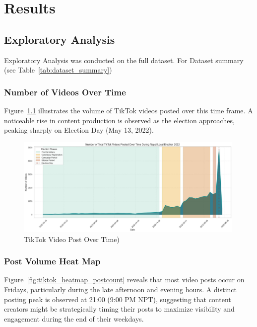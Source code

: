 \documentclass[12pt,a4paper]{report}
\begin{document}
\chapter{Results}
\section{Exploratory Analysis}
Exploratory Analysis was conducted on the full dataset. For Dataset summary (see Table~\ref{tab:dataset_summary})

\subsection{Number of Videos Over Time}
Figure~\ref{fig:tiktok_video_post} illustrates the volume of TikTok videos posted over this time frame. A noticeable rise in content production is observed as the election approaches, peaking sharply on Election Day (May 13, 2022).

\begin{figure}[htbp]
    \centering
    \includegraphics[width=0.99\textwidth]{figures/EDA/tiktok_video_counts_election_period.jpg}
    \caption{TikTok Video Post Over Time)}
    \label{fig:tiktok_video_post}
\end{figure}
\newpage
\subsection{Post Volume Heat Map}

Figure~\ref{fig:tiktok_heatmap_postcount} reveals that most video posts occur on Fridays, particularly during the late afternoon and evening hours. A distinct posting peak is observed at 21:00 (9:00 PM NPT), suggesting that content creators might be strategically timing their posts to maximize visibility and engagement during the end of their weekdays. 
\end{document}
